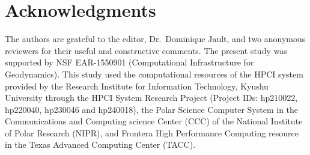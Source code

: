 \section*{Acknowledgments}
The authors are grateful to the editor, Dr.\ Dominique Jault, and two anonymous reviewers for their useful and constructive comments.
The present study was supported by NSF EAR-1550901 (Computational Infrastructure for Geodynamics).
This study used the computational resources of the HPCI system provided by the Research Institute for Information Technology, Kyushu University through the HPCI System Research Project (Project IDs: hp210022, hp220040, hp230046 and hp240018), the Polar Science Computer System in the Communications and Computing science Center (CCC) of the National Institute of Polar Research (NIPR), and Frontera High Performance Computing resource in the Texas Advanced Computing Center (TACC). 

